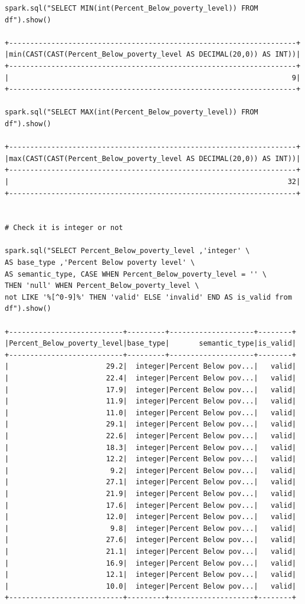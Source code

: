 \documentclass{article}
\begin{document}
\begin{verbatim}
spark.sql("SELECT MIN(int(Percent_Below_poverty_level)) FROM df").show()

+--------------------------------------------------------------------+
|min(CAST(CAST(Percent_Below_poverty_level AS DECIMAL(20,0)) AS INT))|
+--------------------------------------------------------------------+
|                                                                   9|
+--------------------------------------------------------------------+

spark.sql("SELECT MAX(int(Percent_Below_poverty_level)) FROM df").show()

+--------------------------------------------------------------------+
|max(CAST(CAST(Percent_Below_poverty_level AS DECIMAL(20,0)) AS INT))|
+--------------------------------------------------------------------+
|                                                                  32|
+--------------------------------------------------------------------+


# Check it is integer or not

spark.sql("SELECT Percent_Below_poverty_level ,'integer' \  
AS base_type ,'Percent Below poverty level' \  
AS semantic_type, CASE WHEN Percent_Below_poverty_level = '' \  
THEN 'null' WHEN Percent_Below_poverty_level \  
not LIKE '%[^0-9]%' THEN 'valid' ELSE 'invalid' END AS is_valid from df").show()

+---------------------------+---------+--------------------+--------+
|Percent_Below_poverty_level|base_type|       semantic_type|is_valid|
+---------------------------+---------+--------------------+--------+
|                       29.2|  integer|Percent Below pov...|   valid|
|                       22.4|  integer|Percent Below pov...|   valid|
|                       17.9|  integer|Percent Below pov...|   valid|
|                       11.9|  integer|Percent Below pov...|   valid|
|                       11.0|  integer|Percent Below pov...|   valid|
|                       29.1|  integer|Percent Below pov...|   valid|
|                       22.6|  integer|Percent Below pov...|   valid|
|                       18.3|  integer|Percent Below pov...|   valid|
|                       12.2|  integer|Percent Below pov...|   valid|
|                        9.2|  integer|Percent Below pov...|   valid|
|                       27.1|  integer|Percent Below pov...|   valid|
|                       21.9|  integer|Percent Below pov...|   valid|
|                       17.6|  integer|Percent Below pov...|   valid|
|                       12.0|  integer|Percent Below pov...|   valid|
|                        9.8|  integer|Percent Below pov...|   valid|
|                       27.6|  integer|Percent Below pov...|   valid|
|                       21.1|  integer|Percent Below pov...|   valid|
|                       16.9|  integer|Percent Below pov...|   valid|
|                       12.1|  integer|Percent Below pov...|   valid|
|                       10.0|  integer|Percent Below pov...|   valid|
+---------------------------+---------+--------------------+--------+



\end{verbatim}
\end{document}
